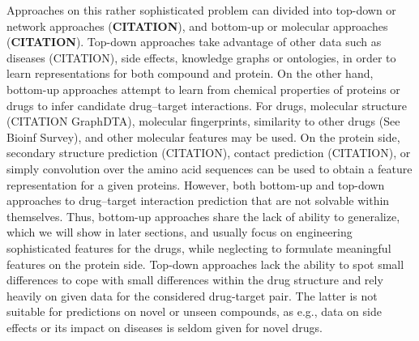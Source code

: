 \documentclass{bioinfo}
\begin{document}
Approaches on this rather sophisticated
problem can divided into top-down or network approaches
(\textbf{CITATION}), and bottom-up or molecular approaches
(\textbf{CITATION}). Top-down approaches take advantage of other data
such as diseases (CITATION), side effects, knowledge graphs or
ontologies, in order to learn representations for both compound and
protein.  On the other hand, bottom-up approaches
attempt to learn from chemical properties of proteins or drugs to
infer candidate drug--target interactions. For drugs, molecular
structure (CITATION GraphDTA), molecular fingerprints, similarity to
other drugs (See Bioinf Survey), and other molecular features may be
used. On the protein side, secondary structure prediction (CITATION),
contact prediction (CITATION), or simply
convolution over the amino acid sequences can be used to obtain a
feature representation for a given proteins. However, both bottom-up
and top-down approaches to drug--target interaction prediction
 that are not solvable within
themselves.
Thus, bottom-up approaches share the lack of ability to
generalize, which we will show in later sections, and usually focus on
engineering sophisticated features for the drugs, while neglecting to
formulate meaningful features on the protein side. Top-down approaches
lack the ability to spot small differences to cope with small
differences within the drug structure and rely heavily on given data
for the considered drug-target pair. The latter is not suitable for
predictions on novel or unseen compounds, as e.g., data on side
effects or its impact on diseases is seldom given for novel drugs.
\end{document}
